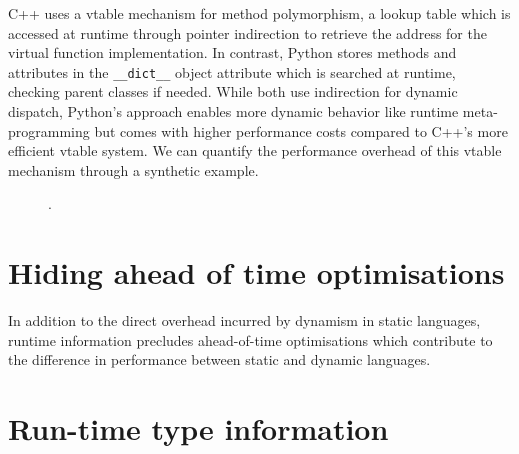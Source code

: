 C++ uses a \ac{vtable} mechanism for method polymorphism, a lookup table which is accessed at runtime through pointer indirection to retrieve the address for the virtual function implementation. In contrast, Python stores methods and attributes in the \texttt{__dict__} object attribute which is searched at runtime, checking parent classes if needed. While both use indirection for dynamic dispatch, Python's approach enables more dynamic behavior like runtime meta-programming but comes with higher performance costs compared to C++'s more efficient vtable system.
We can quantify the performance overhead of this \ac{vtable} mechanism through a synthetic example.


\begin{figure}[H]
    \centering
    \caption{.}
    \label{figure:impact-dispatch}
\end{figure}




\section{Hiding ahead of time optimisations}
\label{chap:dynamism-pattern-rewriting-hiding}

In addition to the direct overhead incurred by dynamism in static languages, runtime information precludes ahead-of-time optimisations which contribute to the difference in performance between static and dynamic languages.



\section{Run-time type information}
\label{chap:dynamism-pattern-rewriting-rtti}

